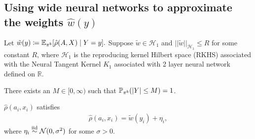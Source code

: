 \subsection{Using wide neural networks to approximate the weights $\hat{w}(y)$}
\begin{assumption}\label{assumption:weights-in-rkhs}
    Let 
    $
    \tilde{w}(y) \coloneqq \mathbb{E}_{\pi^b}[\hat{\rho}(A, X)\mid Y=y].
    $
    Suppose $\tilde{w}  \in \mathcal{H}_1$ and $||\tilde{w}||_{\mathcal{H}_1} \leq R$ for some constant $R$, where $\mathcal{H}_1$ is the reproducing kernel Hilbert space (RKHS) associated with the Neural Tangent Kernel $K_1$ associated with 2 layer neural network defined on $\mathbb{R}$.
\end{assumption}
\begin{assumption}\label{assumption:outcome-bounded}
    There exists an $M \in [0, \infty)$ such that $\mathbb{P}_{\pi^b}(|Y| \leq M) = 1$.
\end{assumption}

\begin{assumption}\label{assumption:pol-ratios-bounded}
$\hat{\rho}(a_i, x_i)$ satisfies
    \begin{align*}
        \hat{\rho}(a_i, x_i) = \tilde{w}(y_i) + \eta_i,
    \end{align*}
    where $\eta_i \overset{\textup{iid}}{\sim} \mathcal{N}(0, \sigma^2)$ for some $\sigma > 0$. 
\end{assumption}

